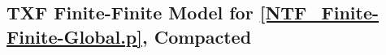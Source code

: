\documentclass{easychair}
\begin{document}
\newpage
\subsection{TXF Finite-Finite Model for \ref{NTF_Finite-Finite-Global.p}, Compacted}
\label{NTF_Finite-Finite-Global_Compact.s}
\begin{small}

\end{small}

\end{document}
